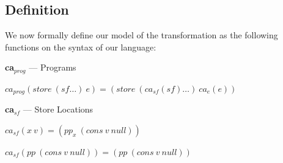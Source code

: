 
\subsection{Definition}
We now formally define our model of the transformation as the following functions on the syntax of our language:

\begin{definition} {\large\textbf{ca$_{prog}$}} --- Programs

$ca_{prog}(store\ (sf \dots)\ e) = (store\ (ca_{sf}(sf) \dots)\ ca_e(e)) $

\end{definition}

\begin{definition} {\large\textbf{ca$_{sf}$}} --- Store Locations

$ca_{sf}(x\ v) = (pp_x\ (cons\ v\ null))$

$ca_{sf}(pp\ (cons\ v\ null)) = (pp\ (cons\ v\ null))$
\end{definition}

